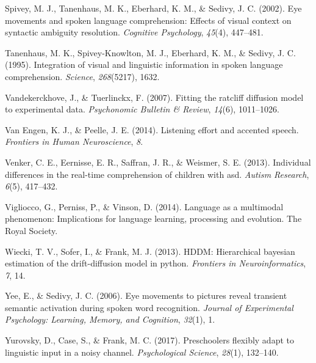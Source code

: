 \documentclass[english,floatsintext,man]{apa6}
\begin{document}
\leavevmode\hypertarget{ref-spivey2002eye}{}%
Spivey, M. J., Tanenhaus, M. K., Eberhard, K. M., \& Sedivy, J. C.
(2002). Eye movements and spoken language comprehension: Effects of
visual context on syntactic ambiguity resolution. \emph{Cognitive
Psychology}, \emph{45}(4), 447--481.

\leavevmode\hypertarget{ref-tanenhaus1995integration}{}%
Tanenhaus, M. K., Spivey-Knowlton, M. J., Eberhard, K. M., \& Sedivy, J.
C. (1995). Integration of visual and linguistic information in spoken
language comprehension. \emph{Science}, \emph{268}(5217), 1632.

\leavevmode\hypertarget{ref-vandekerckhove2007fitting}{}%
Vandekerckhove, J., \& Tuerlinckx, F. (2007). Fitting the ratcliff
diffusion model to experimental data. \emph{Psychonomic Bulletin \&
Review}, \emph{14}(6), 1011--1026.

\leavevmode\hypertarget{ref-van2014listening}{}%
Van Engen, K. J., \& Peelle, J. E. (2014). Listening effort and accented
speech. \emph{Frontiers in Human Neuroscience}, \emph{8}.

\leavevmode\hypertarget{ref-venker2013individual}{}%
Venker, C. E., Eernisse, E. R., Saffran, J. R., \& Weismer, S. E.
(2013). Individual differences in the real-time comprehension of
children with asd. \emph{Autism Research}, \emph{6}(5), 417--432.

\leavevmode\hypertarget{ref-vigliocco2014language}{}%
Vigliocco, G., Perniss, P., \& Vinson, D. (2014). Language as a
multimodal phenomenon: Implications for language learning, processing
and evolution. The Royal Society.

\leavevmode\hypertarget{ref-wiecki2013hddm}{}%
Wiecki, T. V., Sofer, I., \& Frank, M. J. (2013). HDDM: Hierarchical
bayesian estimation of the drift-diffusion model in python.
\emph{Frontiers in Neuroinformatics}, \emph{7}, 14.

\leavevmode\hypertarget{ref-yee2006eye}{}%
Yee, E., \& Sedivy, J. C. (2006). Eye movements to pictures reveal
transient semantic activation during spoken word recognition.
\emph{Journal of Experimental Psychology: Learning, Memory, and
Cognition}, \emph{32}(1), 1.

\leavevmode\hypertarget{ref-yurovsky2017preschoolers}{}%
Yurovsky, D., Case, S., \& Frank, M. C. (2017). Preschoolers flexibly
adapt to linguistic input in a noisy channel. \emph{Psychological
Science}, \emph{28}(1), 132--140.
\end{document}

